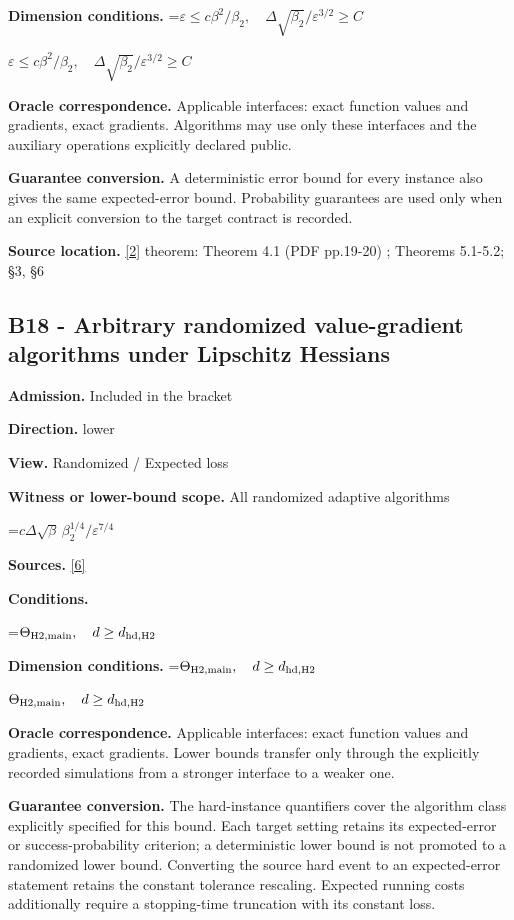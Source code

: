 \documentclass[10pt,a4paper]{article}
\newcommand{\AtlasMath}[1]{\par\begingroup\centering\setbox0=\hbox{$\displaystyle #1$}\ifdim\wd0>1.4\linewidth\typeout{ATLAS WIDE FORMULA: \the\wd0}\fi\ifdim\wd0>\linewidth\resizebox{\linewidth}{!}{\box0}\else\box0\fi\par\endgroup}
\newcommand{\AtlasInlineMath}[1]{\begingroup\setbox0=\hbox{$#1$}\ifdim\wd0>.4\linewidth\endgroup\AtlasMath{#1}\else\endgroup$#1$\fi}
\begin{document}
\textbf{Dimension conditions.} \AtlasInlineMath{\varepsilon\le c\beta^2/\beta_2,\quad\Delta\sqrt{\beta_2}/\varepsilon^{3/2}\ge C}

\textbf{Oracle correspondence.} Applicable interfaces: exact function values and gradients, exact gradients. Algorithms may use only these interfaces and the auxiliary operations explicitly declared public.

\textbf{Guarantee conversion.} A deterministic error bound for every instance also gives the same expected-error bound. Probability guarantees are used only when an explicit conversion to the target contract is recorded.

\textbf{Source location.} \href{https://arxiv.org/pdf/2610.02791}{[2]} theorem: Theorem 4.1 (PDF pp.19-20) ; Theorems 5.1-5.2; §3, §6

\subsection{B18 - Arbitrary randomized value-gradient algorithms under Lipschitz Hessians}
\textbf{Admission.} Included in the bracket

\textbf{Direction.} lower

\textbf{View.} Randomized / Expected loss

\textbf{Witness or lower-bound scope.} All randomized adaptive algorithms

\AtlasMath{c\Delta\sqrt\beta\,\beta_2^{1/4}/\varepsilon^{7/4}}
\textbf{Sources.} \href{https://arxiv.org/pdf/2610.00245v2}{[6]}

\textbf{Conditions.} 
\AtlasMath{\Theta_{\rm H2,main},\quad d\ge d_{\rm hd,H2}}


\textbf{Dimension conditions.} \AtlasInlineMath{\Theta_{\rm H2,main},\quad d\ge d_{\rm hd,H2}}

\textbf{Oracle correspondence.} Applicable interfaces: exact function values and gradients, exact gradients. Lower bounds transfer only through the explicitly recorded simulations from a stronger interface to a weaker one.

\textbf{Guarantee conversion.} The hard-instance quantifiers cover the algorithm class explicitly specified for this bound. Each target setting retains its expected-error or success-probability criterion; a deterministic lower bound is not promoted to a randomized lower bound. Converting the source hard event to an expected-error statement retains the constant tolerance rescaling. Expected running costs additionally require a stopping-time truncation with its constant loss.
\end{document}
